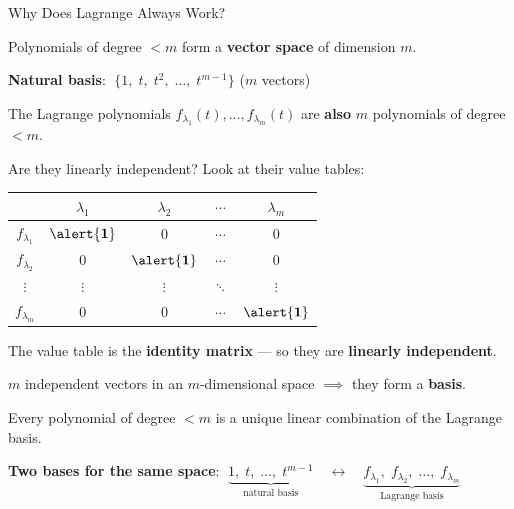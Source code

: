 \documentclass[10pt]{beamer}
\theoremstyle{definition}
\newcommand{\x}[1]{\alert{\textbf{#1}}}
\begin{document}
\begin{frame}[shrink=5]{Why Does Lagrange Always Work?}

Polynomials of degree $< m$ form a \x{vector space} of dimension $m$.

\vfill

\x{Natural basis}: $\;\{1,\; t,\; t^2,\; \ldots,\; t^{m-1}\}$ \quad ($m$ vectors)

\vfill\pause

The Lagrange polynomials $f_{\lambda_1}(t), \ldots, f_{\lambda_m}(t)$ are \x{also} $m$ polynomials of degree $< m$.

\vfill

Are they linearly independent? \; Look at their value tables:

\begin{center}
\renewcommand{\arraystretch}{1.3}
\begin{tabular}{c|cccc}
 & $\lambda_1$ & $\lambda_2$ & $\cdots$ & $\lambda_m$ \\
\hline
$f_{\lambda_1}$ & $\x{1}$ & $0$ & $\cdots$ & $0$ \\
$f_{\lambda_2}$ & $0$ & $\x{1}$ & $\cdots$ & $0$ \\
$\vdots$ & $\vdots$ & $\vdots$ & $\ddots$ & $\vdots$ \\
$f_{\lambda_m}$ & $0$ & $0$ & $\cdots$ & $\x{1}$
\end{tabular}
\end{center}

\vfill

The value table is the \x{identity matrix} --- so they are \x{linearly independent}.

\vfill\pause

$m$ independent vectors in an $m$-dimensional space $\implies$ they form a \x{basis}.

\vfill

Every polynomial of degree $< m$ is a unique linear combination of the Lagrange basis.

\vfill

\x{Two bases for the same space}: $\;\underbrace{1,\; t,\; \ldots,\; t^{m-1}}_{\text{natural basis}} \quad\longleftrightarrow\quad \underbrace{f_{\lambda_1},\; f_{\lambda_2},\; \ldots,\; f_{\lambda_m}}_{\text{Lagrange basis}}$

\end{frame}
\end{document}
